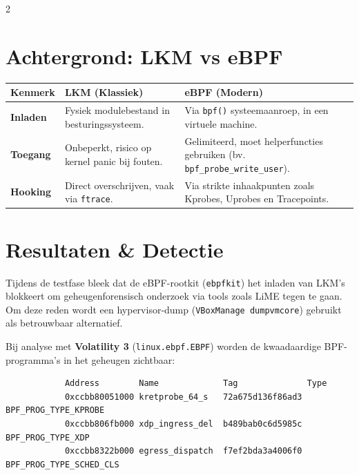 \documentclass[a0,portrait]{hogent-poster}
\begin{document}
\begin{multicols}{2}
        \section{Achtergrond: LKM vs eBPF}
        \begin{center}
            \begin{tabular}{|l|p{14cm}|p{14cm}|}
                \hline
                \textbf{Kenmerk} & \textbf{LKM (Klassiek)} & \textbf{eBPF (Modern)} \\
                \hline
                \textbf{Inladen} & Fysiek modulebestand in besturingssysteem. & Via \texttt{bpf()} systeemaanroep, in een virtuele machine. \\
                \hline
                \textbf{Toegang} & Onbeperkt, risico op kernel panic bij fouten. & Gelimiteerd, moet helperfuncties gebruiken (bv. \texttt{bpf\_probe\_write\_user}). \\
                \hline
                \textbf{Hooking} & Direct overschrijven, vaak via \texttt{ftrace}. & Via strikte inhaakpunten zoals Kprobes, Uprobes en Tracepoints. \\
                \hline
            \end{tabular}
        \end{center}
        
        \section{Resultaten \& Detectie}
        Tijdens de testfase bleek dat de eBPF-rootkit (\texttt{ebpfkit}) het inladen van LKM's blokkeert om geheugenforensisch onderzoek via tools zoals LiME tegen te gaan. Om deze reden wordt een hypervisor-dump (\texttt{VBoxManage dumpvmcore}) gebruikt als betrouwbaar alternatief.
        
        Bij analyse met \textbf{Volatility 3} (\texttt{linux.ebpf.EBPF}) worden de kwaadaardige BPF-programma's in het geheugen zichtbaar:
        
        \begin{verbatim}
            Address        Name             Tag              Type
            0xccbb80051000 kretprobe_64_s   72a675d136f86ad3 BPF_PROG_TYPE_KPROBE
            0xccbb806fb000 xdp_ingress_del  b489bab0c6d5985c BPF_PROG_TYPE_XDP
            0xccbb8322b000 egress_dispatch  f7ef2bda3a4006f0 BPF_PROG_TYPE_SCHED_CLS
        \end{verbatim}
        

\end{multicols}
\end{document}
